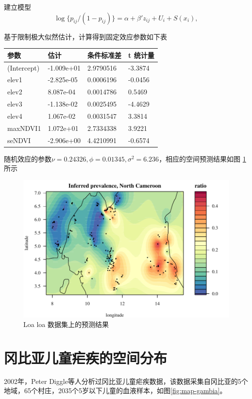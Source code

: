 \documentclass[hyperref, a4paper, UTF8, zihao = -4, linespread = 1.25, scheme = chinese]{ctexbook}
\begin{document}
建立模型 \begin{equation} 
\log\{p_{ij}/(1-p_{ij})\} = \alpha + \beta'z_{ij} + U_{i} + S(x_{i}),
\end{equation}

基于限制极大似然估计，计算得到固定效应参数如下表

\begin{longtable}[]{@{}llll@{}}
\toprule
参数 & 估计 & 条件标准差 & t 统计量\tabularnewline
\midrule
\endhead
(Intercept) & -1.009e+01 & 2.9790516 & -3.3874\tabularnewline
elev1 & -2.825e-05 & 0.0006196 & -0.0456\tabularnewline
elev2 & 8.087e-04 & 0.0014786 & 0.5469\tabularnewline
elev3 & -1.138e-02 & 0.0025495 & -4.4629\tabularnewline
elev4 & 1.067e-02 & 0.0031547 & 3.3814\tabularnewline
maxNDVI1 & 1.072e+01 & 2.7334338 & 3.9221\tabularnewline
seNDVI & -2.906e+00 & 4.4210991 & -0.6574\tabularnewline
\bottomrule
\end{longtable}

随机效应的参数\(\nu = 0.24326,\phi = 0.01345,\sigma^2 = 6.236\)，相应的空间预测结果如图
\ref{fig:spamm-loaloa}所示

\begin{figure}

{\centering \includegraphics[width=0.7\linewidth]{figures/spaMM-loaloa} 

}

\caption{Loa loa 数据集上的预测结果}\label{fig:spamm-loaloa}
\end{figure}

\section{冈比亚儿童疟疾的空间分布}

2002年，Peter
Diggle等人分析过冈比亚儿童疟疾数据，该数据采集自冈比亚的5个地域，65个村庄，2035个5岁以下儿童的血液样本，如图\ref{fig:map-gambia}。
\end{document}
